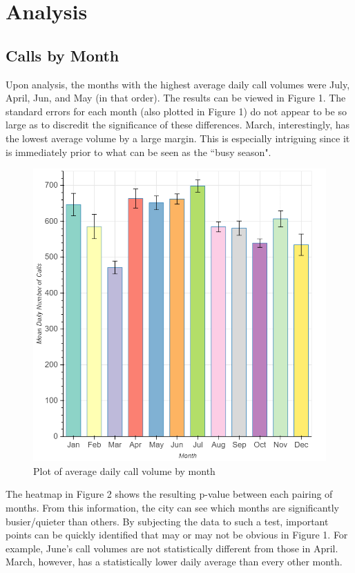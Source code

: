 \documentclass[11pt,twocolumn]{article}
\begin{document}
\section{Analysis}

	\subsection{Calls by Month}

Upon analysis, the months with the highest average daily call volumes were July, April, Jun, and May (in that order).  The results can be viewed in Figure 1.  The standard errors for each month (also plotted in Figure 1) do not appear to be so large as to discredit the significance of these differences.  March, interestingly, has the lowest average volume by a large margin.  This is especially intriguing since it is immediately prior to what can be seen as the ``busy season".

\begin{figure}[h]
  \includegraphics[scale=.27]{month_bar.png}
  \caption{Plot of average daily call volume by month}
\end{figure}

The heatmap in Figure 2 shows the resulting p-value between each pairing of months.  From this information, the city can see which months are significantly busier/quieter than others.  By subjecting the data to such a test, important points can be quickly identified that may or may not be obvious in Figure 1.  For example, June's call volumes are not statistically different from those in April.  March, however, has a statistically lower daily average than every other month.
\end{document}
